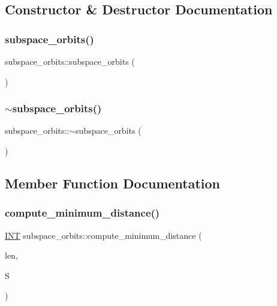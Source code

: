 \subsection{Constructor \& Destructor Documentation}
\mbox{\label{classsubspace__orbits_a80622ec286b1fbdc91dd97da0eb8c318}} 
\subsubsection{\texorpdfstring{subspace\+\_\+orbits()}{subspace\_orbits()}}
{\footnotesize\ttfamily subspace\+\_\+orbits\+::subspace\+\_\+orbits (\begin{DoxyParamCaption}{ }\end{DoxyParamCaption})}

\mbox{\label{classsubspace__orbits_af72dac3eb8591f49c8d82e0ea3e75743}} 
\subsubsection{\texorpdfstring{$\sim$subspace\+\_\+orbits()}{~subspace\_orbits()}}
{\footnotesize\ttfamily subspace\+\_\+orbits\+::$\sim$subspace\+\_\+orbits (\begin{DoxyParamCaption}{ }\end{DoxyParamCaption})}



\subsection{Member Function Documentation}
\mbox{\label{classsubspace__orbits_a5737a3a8a3aad0ac5befc191f91cae3d}} 
\subsubsection{\texorpdfstring{compute\+\_\+minimum\+\_\+distance()}{compute\_minimum\_distance()}}
{\footnotesize\ttfamily \mbox{\hyperlink{galois_8h_a09fddde158a3a20bd2dcadb609de11dc}{I\+NT}} subspace\+\_\+orbits\+::compute\+\_\+minimum\+\_\+distance (\begin{DoxyParamCaption}\item[{\mbox{\hyperlink{galois_8h_a09fddde158a3a20bd2dcadb609de11dc}{I\+NT}}}]{len,  }\item[{\mbox{\hyperlink{galois_8h_a09fddde158a3a20bd2dcadb609de11dc}{I\+NT}} $\ast$}]{S }\end{DoxyParamCaption})}

